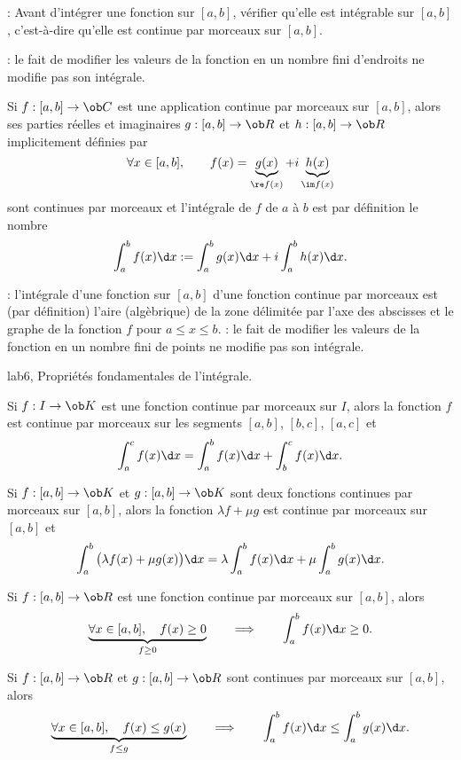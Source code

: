 \Remarque: Avant d'intégrer une fonction sur $[a,b]$, vérifier qu'elle est intégrable sur $[a,b]$, c'est-à-dire qu'elle est continue par morceaux sur $[a,b]$. 
\bigskip

\Remarque : le fait de modifier les valeurs de la fonction en un nombre fini d'endroits ne modifie pas son intégrale. 
\bigskip

\Definition [$a<b$] 
Si $f:[a,b]\to\ob C$ est une application continue par morceaux sur $[a,b]$, alors ses parties réelles et imaginaires $g:[a,b]\to\ob R$ et $h:[a,b]\to\ob R$ implicitement définies par 
$$
\forall x\in[a,b], \qquad f(x)=\underbrace{g(x)}_{\re f(x)}+i\underbrace{h(x)}_{\im f(x)}
$$
sont continues par morceaux et l'intégrale de $f$ de $a$ à $b$ est par définition le nombre 
$$
\int_a^bf(x)\d x:=\int_a^bg(x)\d x+i\int_a^bh(x)\d x.
$$

\Remarque : l'intégrale d'une fonction sur $[a,b]$ d'une fonction continue par morceaux est (par définition) l'aire (algèbrique) de la zone délimitée par l'axe des abscisses et le graphe de la fonction $f$ pour $a\le x\le b$. 
\bigskip
\Remarque  : le fait de modifier les valeurs de la fonction en un nombre fini de points ne modifie pas son intégrale. 
\bigskip

\Section lab6, Propriétés fondamentales de l'intégrale. 
\bigskip

\Propriete [$I$ intervalle, $(a,b,c)\in I^3$] 
Si $f:I\to\ob K$ est une fonction continue par morceaux sur $I$, alors la fonction $f$ est continue par morceaux sur les segments $[a,b]$, $[b,c]$, $[a,c]$ et 
$$
\int_a^cf(x)\d x=\int_a^bf(x)\d x+\int_b^cf(x)\d x. 
$$

\Propriete [$(a,b)\in\ob R^2$, $(\lambda,\mu)\in\ob K^2$] 
Si $f:[a,b]\to\ob K$ et $g:[a,b]\to\ob K$ sont deux fonctions continues par morceaux sur $[a,b]$, alors la fonction $\lambda f+\mu g$ est continue par morceaux sur $[a,b]$ et 
\Equation [\bf Linéarité]
$$
\int_a^b\big(\lambda f(x)+\mu g(x)\big)\d x=\lambda \int_a^bf(x)\d x+\mu \int_a^bg(x)\d x. 
$$

\Propriete [$a\le b$] 
Si $f:[a,b]\to\ob R$ est une fonction continue par morceaux sur $[a,b]$, alors 
\Equation [\bf Positivité]
$$
\underbrace{
\forall x\in[a,b],\quad f(x)\ge0}_{f\ge0}\qquad\Longrightarrow\qquad \int_a^bf(x)\d x\ge0.
$$ 


\Propriete [$a\le b$]
Si $f:[a,b]\to\ob R$ et $g:[a,b]\to\ob R$ sont continues par morceaux sur $[a,b]$, alors
\Equation [ \bf Croissance]
$$
\underbrace{
\forall x\in[a,b],\quad f(x)\le g(x)}_{f\le g}\qquad\Longrightarrow\qquad \int_a^bf(x)\d x\le \int_a^bg(x)\d x.
$$ 

